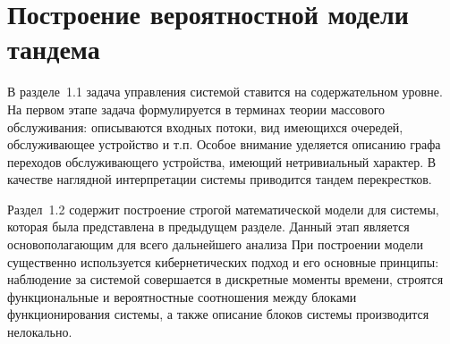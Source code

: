 \documentclass{report}
\begin{document}
\newpage
\section{Построение вероятностной модели тандема}

В разделе~1.1 задача управления системой ставится на содержательном уровне. На первом этапе задача формулируется в терминах теории массового обслуживания: описываются входных потоки, вид имеющихся очередей, обслуживающее устройство и т.п. Особое внимание уделяется описанию графа переходов обслуживающего устройства, имеющий нетривиальный характер. В качестве наглядной интерпретации системы приводится тандем перекрестков. 

Раздел~1.2 содержит построение строгой математической модели для системы, которая была представлена в предыдущем разделе. Данный этап является основополагающим для всего дальнейшего анализа  При построении модели существенно используется кибернетических подход и его основные принципы: наблюдение за системой совершается в дискретные моменты времени,  строятся функциональные и вероятностные соотношения между блоками функционирования системы, а также описание блоков системы производится нелокально.
\end{document}
